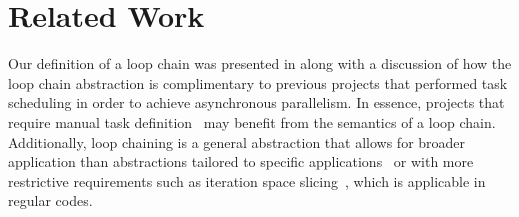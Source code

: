 %
%



\section{Related Work}
\label{sec:relatedwork}
Our definition of a loop chain was presented in \cite{KriegerHIPS2013} along with 
a discussion of how the loop chain abstraction is complimentary to previous projects 
that performed task scheduling in order to achieve asynchronous parallelism.
In essence, projects that require manual task 
definition~\cite{Cicotti11,CnCIPDPS10,Augonnet11,Duran2008} may benefit from the 
semantics of a loop chain.  Additionally, loop chaining is a general abstraction that 
allows for broader application than abstractions tailored to specific applications~\cite{Chan2008} 
or with more restrictive requirements such as iteration space slicing~\cite{Pugh97, slicingLocality99},
which is applicable in regular codes.

